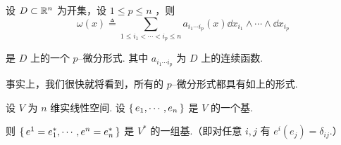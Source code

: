 \begin{example}
    设 $D\subset\mathbb{R}^n$ 为开集，设 $1\le p\le n$ ，则
$$
\omega(x)\triangleq\sum_{1\le i_1<\cdots<i_p\le n}a_{i_1\cdots i_p}(x)\dd x_{i_1}\wedge\cdots\wedge\dd x_{i_p}
$$

    是 $D$ 上的一个 $p$--微分形式. 其中 $a_{i_1\cdots i_p}$ 为 $D$ 上的连续函数.

    事实上，我们很快就将看到，所有的 $p$--微分形式都具有如上的形式.
\end{example}



设 $V$ 为 $n$ 维实线性空间. 设 $\set{e_1,\cdots,e_n}$ 是 $V$ 的一个基.

则 $\set{e^1=e_1^*,\cdots,e^n=e_n^*}$ 是 $V^*$ 的一组基.（即对任意 $i,j$ 有 $e^i(e_j)=\delta_{ij}$.）

